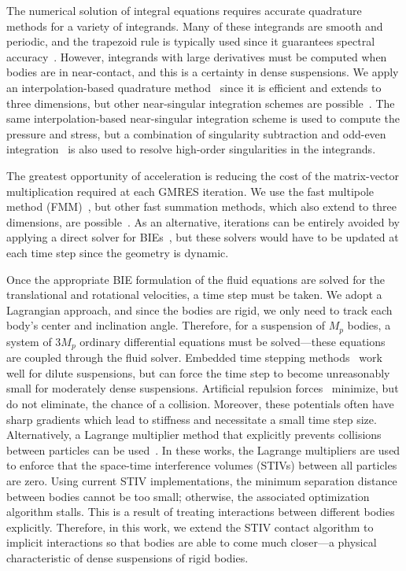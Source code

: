 \documentclass[AMA,STIX1COL]{WileyNJD-v2}
\begin{document}
The numerical solution of integral equations requires accurate
quadrature methods for a variety of integrands.  Many of these
integrands are smooth and periodic, and the trapezoid rule is typically
used since it guarantees spectral accuracy~\cite{Trefethan2014}.
However, integrands with large derivatives must be computed when bodies
are in near-contact, and this is a certainty in dense suspensions.  We
apply an interpolation-based quadrature method~\cite{Ying2006,
Quaife2014} since it is efficient and extends to three dimensions, but
other near-singular integration schemes are possible~\cite{Klockner2013,
Barnett2015, Beale2016, Helsing2008, Kropinski1999, Mammoli2006,
Siegel2018}.  The same interpolation-based near-singular integration
scheme is used to compute the pressure and stress, but a combination of
singularity subtraction and odd-even integration~\cite{sid-isr1988,
Quaife2014} is also used to resolve high-order singularities in the
integrands.

The greatest opportunity of acceleration is reducing the cost of the
matrix-vector multiplication required at each GMRES iteration.  We use
the fast multipole method (FMM)~\cite{Greengard1987,Greenbaum1992},
but other fast summation methods, which also extend to three dimensions,
are possible~\cite{bar-hut1986, kli-tor2014}.  As an alternative,
iterations can be entirely avoided by applying a direct solver for
BIEs~\cite{mar-bar-gil-vee2016}, but these solvers would have to be
updated at each time step since the geometry is dynamic.

Once the appropriate BIE formulation of the fluid equations are solved
for the translational and rotational velocities, a time step must be
taken.  We adopt a Lagrangian approach, and since the bodies are rigid,
we only need to track each body's center and inclination angle.
Therefore, for a suspension of $M_p$ bodies, a system of $3M_p$ ordinary
differential equations must be solved---these equations are coupled
through the fluid solver.  Embedded time stepping
methods~\cite{kli-tor2014} work well for dilute suspensions, but can
force the time step to become unreasonably small for moderately dense
suspensions. Artificial repulsion forces~\cite{Flormann2017, Liu2006,
Malhotra2018, Lu2017, Kabacogulu2017} minimize, but do not eliminate,
the chance of a collision. Moreover, these potentials often have sharp
gradients which lead to stiffness and necessitate a small time step
size. Alternatively, a Lagrange multiplier method that explicitly
prevents collisions between particles can be used~\cite{Harmon2011,
Lu2017}.  In these works, the Lagrange multipliers are used to enforce
that the space-time interference volumes (STIVs) between all particles
are zero.  Using current STIV implementations, the minimum separation
distance between bodies cannot be too small; otherwise, the associated
optimization algorithm stalls.  This is a result of treating
interactions between different bodies explicitly.  Therefore, in this
work, we extend the STIV contact algorithm to implicit interactions so
that bodies are able to come much closer---a physical characteristic of
dense suspensions of rigid bodies.
\end{document}
